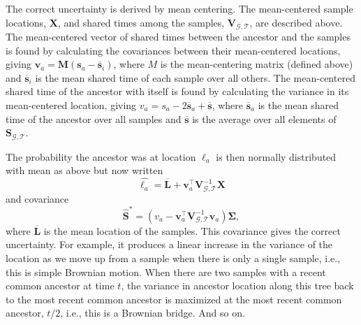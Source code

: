 \documentclass[12pt]{article}
\begin{document}
The correct uncertainty is derived by mean centering.
The mean-centered sample locations, $\mathbf{X}$, and shared times among the samples, $\mathbf{V}_{\mathcal{G},\mathcal{T}}$, are described above.
The mean-centered vector of shared times between the ancestor and the samples is found by calculating the covariances between their mean-centered locations, giving $\mathbf{v}_a = \mathbf{M}(\mathbf{s}_a - \overline{\mathbf{s}}_i)$, where $M$ is the mean-centering matrix (defined above) and $\overline{\mathbf{s}}_i$ is the mean shared time of each sample over all others.
The mean-centered shared time of the ancestor with itself is found by calculating the variance in its mean-centered location, giving $v_a = s_a - 2\overline{\mathbf{s}}_a + \overline{\mathbf{s}}$, where $\overline{\mathbf{s}}_a$ is the mean shared time of the ancestor over all samples and $\overline{\mathbf{s}}$ is the average over all elements of $\mathbf{S}_{\mathcal{G},\mathcal{T}}$.

The probability the ancestor was at location $\bm{\ell}_a$ is then normally distributed with
%
mean as above but now written
\begin{equation}\label{eq:sahatCentered}
\widehat{\bm{\ell}_a} = \overline{\mathbf{L}} + \mathbf{v}_a^\intercal \mathbf{V}_{\mathcal{G},\mathcal{T}}^{-1} \mathbf{X} 
\end{equation}
%
and covariance
%
\begin{equation}\label{eq:ChatCentered}
\widehat{\mathbf{S}}^* = \left( v_a - \mathbf{v}_a^\intercal \mathbf{V}_{\mathcal{G},\mathcal{T}}^{-1} \mathbf{v}_a \right) \mathbf{\Sigma},
\end{equation}
where $\overline{\mathbf{L}}$ is the mean location of the samples. 
%
This covariance gives the correct uncertainty.
For example, it produces a linear increase in the variance of the location as we move up from a sample when there is only a single sample, i.e., this is simple Brownian motion.
When there are two samples with a recent common ancestor at time $t$, the variance in ancestor location along this tree back to the most recent common ancestor is maximized at the most recent common ancestor, $t/2$, i.e., this is a Brownian bridge.
And so on.
\end{document}
